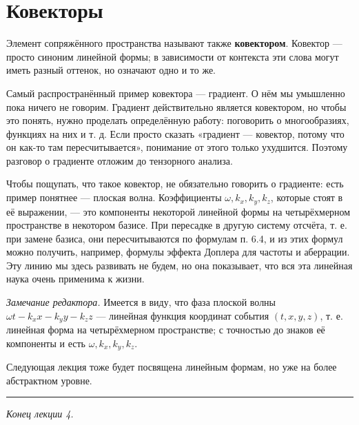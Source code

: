 \documentclass[11pt,a4paper]{article}
\begin{document}
\section{Ковекторы}

Элемент сопряжённого пространства называют также \textbf{ковектором}. Ковектор — просто синоним линейной формы; в зависимости от контекста эти слова могут иметь разный оттенок, но означают одно и то же.

Самый распространённый пример ковектора — градиент. О нём мы умышленно пока ничего не говорим. Градиент действительно является ковектором, но чтобы это понять, нужно проделать определённую работу: поговорить о многообразиях, функциях на них и т. д. Если просто сказать «градиент — ковектор, потому что он как-то там пересчитывается», понимание от этого только ухудшится. Поэтому разговор о градиенте отложим до тензорного анализа.

Чтобы пощупать, что такое ковектор, не обязательно говорить о градиенте: есть пример понятнее — плоская волна. Коэффициенты $\omega, k_x, k_y, k_z$, которые стоят в её выражении, — это компоненты некоторой линейной формы на четырёхмерном пространстве в некотором базисе. При пересадке в другую систему отсчёта, т. е. при замене базиса, они пересчитываются по формулам п. 6.4, и из этих формул можно получить, например, формулы эффекта Доплера для частоты и аберрации. Эту линию мы здесь развивать не будем, но она показывает, что вся эта линейная наука очень применима к жизни.

\emph{Замечание редактора.} Имеется в виду, что фаза плоской волны $\omega t - k_x x - k_y y - k_z z$ — линейная функция координат события $(t, x, y, z)$, т. е. линейная форма на четырёхмерном пространстве; с точностью до знаков её компоненты и есть $\omega, k_x, k_y, k_z$.

Следующая лекция тоже будет посвящена линейным формам, но уже на более абстрактном уровне.

\par\bigskip\noindent\rule{\textwidth}{0.4pt}\par\noindent \emph{Конец лекции 4.}
\end{document}

